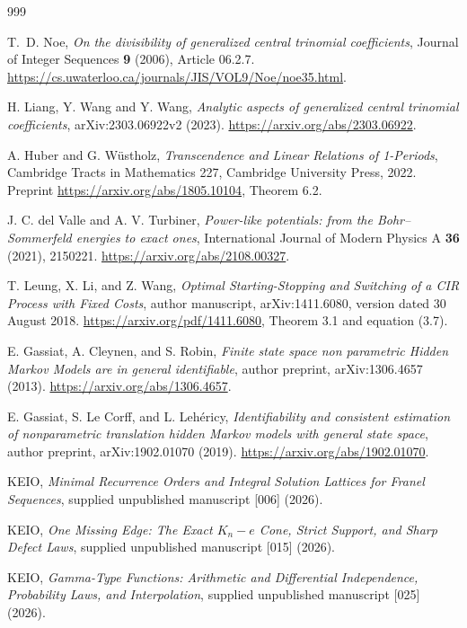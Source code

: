 \documentclass[11pt,a4paper]{article}
\theoremstyle{definition}
\theoremstyle{remark}
\numberwithin{equation}{section}
\begin{document}
\clearpage
{}
{}
\begin{thebibliography}{999}
\raggedright
{}
T.~D. Noe, \emph{On the divisibility of generalized central trinomial coefficients},
Journal of Integer Sequences \textbf{9} (2006), Article 06.2.7.
\url{https://cs.uwaterloo.ca/journals/JIS/VOL9/Noe/noe35.html}.

H. Liang, Y. Wang and Y. Wang,
\emph{Analytic aspects of generalized central trinomial coefficients},
arXiv:2303.06922v2 (2023).
\url{https://arxiv.org/abs/2303.06922}.

A. Huber and G. W\"ustholz,
\emph{Transcendence and Linear Relations of 1-Periods},
Cambridge Tracts in Mathematics 227, Cambridge University Press, 2022.
Preprint \url{https://arxiv.org/abs/1805.10104}, Theorem 6.2.

J. C. del Valle and A. V. Turbiner,
\emph{Power-like potentials: from the Bohr--Sommerfeld energies to exact ones},
International Journal of Modern Physics A \textbf{36} (2021), 2150221.
\url{https://arxiv.org/abs/2108.00327}.

T. Leung, X. Li, and Z. Wang,
\emph{Optimal Starting-Stopping and Switching of a CIR Process with Fixed Costs},
author manuscript, arXiv:1411.6080, version dated 30 August 2018.
\url{https://arxiv.org/pdf/1411.6080}, Theorem 3.1 and equation (3.7).

E. Gassiat, A. Cleynen, and S. Robin,
\emph{Finite state space non parametric Hidden Markov Models are in general identifiable},
author preprint, arXiv:1306.4657 (2013).
\url{https://arxiv.org/abs/1306.4657}.

E. Gassiat, S. Le Corff, and L. Leh\'ericy,
\emph{Identifiability and consistent estimation of nonparametric translation hidden Markov models with general state space},
author preprint, arXiv:1902.01070 (2019).
\url{https://arxiv.org/abs/1902.01070}.

KEIO,
\emph{Minimal Recurrence Orders and Integral Solution Lattices for Franel Sequences},
supplied unpublished manuscript [006] (2026).

KEIO,
\emph{One Missing Edge: The Exact $K_n-e$ Cone, Strict Support, and Sharp Defect Laws},
supplied unpublished manuscript [015] (2026).

KEIO,
\emph{Gamma-Type Functions: Arithmetic and Differential Independence, Probability Laws, and Interpolation},
supplied unpublished manuscript [025] (2026).


\end{thebibliography}
\end{document}

